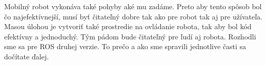 Mobilný robot vykonáva také pohyby aké mu zadáme. Preto aby tento spôsob bol čo najefektívnejší, musí byť čitateľný dobre tak ako pre robot tak aj pre užívateľa.
Masou úlohou je vytvoriť také prostredie na ovládanie robota, tak aby bol kód efektívny a jednoduchý. Tým pádom bude čitateľný pre ľudí aj robota. Rozhodli sme
sa pre ROS druhej verzie. To prečo a ako sme spravili jednotlive časti sa dočítate ďalej.

